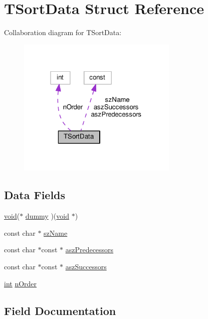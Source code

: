 \hypertarget{structTSortData}{}\section{T\+Sort\+Data Struct Reference}
\label{structTSortData}


Collaboration diagram for T\+Sort\+Data\+:
\nopagebreak
\begin{figure}[H]
\begin{center}
\leavevmode
\includegraphics[width=217pt]{structTSortData__coll__graph}
\end{center}
\end{figure}
\subsection*{Data Fields}
\begin{DoxyCompactItemize}
\item 
\hyperlink{group__MOD__ISAPI_gacd6cdbf73df3d9eed42fa493d9b621a6}{void}($\ast$ \hyperlink{structTSortData_a9b8880246e3c4809ac5175e18a3439b9}{dummy} )(\hyperlink{group__MOD__ISAPI_gacd6cdbf73df3d9eed42fa493d9b621a6}{void} $\ast$)
\item 
const char $\ast$ \hyperlink{structTSortData_a9e9aa97b772f82dcdcdc67db15caae4a}{sz\+Name}
\item 
const char $\ast$const $\ast$ \hyperlink{structTSortData_ab4d190f818c1896cf3dc72640b2aa212}{asz\+Predecessors}
\item 
const char $\ast$const $\ast$ \hyperlink{structTSortData_aa387731427c4510472fe6820f1125d54}{asz\+Successors}
\item 
\hyperlink{pcre_8txt_a42dfa4ff673c82d8efe7144098fbc198}{int} \hyperlink{structTSortData_a6d417262bfdd3af353d05dc9783a3ade}{n\+Order}
\end{DoxyCompactItemize}


\subsection{Field Documentation}
